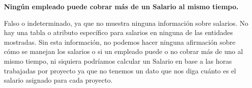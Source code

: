 \textbf{Ningún empleado puede cobrar más de un Salario al mismo tiempo.}\vspace{.3cm}

Falso o indeterminado, ya que no muestra ninguna información sobre salarios. No hay una tabla o atributo específico para salarios en ninguna de las entidades mostradas. Sin esta información, no podemos hacer ninguna afirmación sobre cómo se manejan los salarios o si un empleado puede o no cobrar más de uno al mismo tiempo, ni siquiera podríamos calcular un Salario en base a las horas trabajadas por proyecto ya que no tenemos un dato que nos diga cuánto es el salario asignado para cada proyecto. 